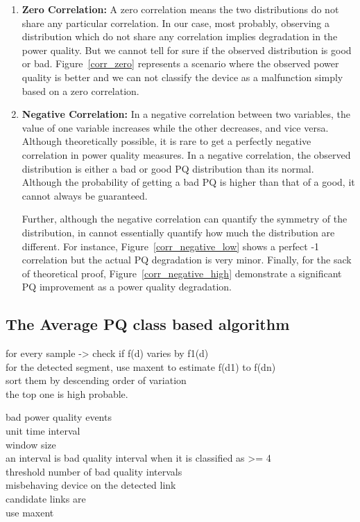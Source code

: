 \documentclass[12pt,oneside]{book}
\begin{document}
\begin{enumerate}
\item \textbf{Zero Correlation:} A zero correlation means the two distributions do not share any particular correlation. In our case, most probably, observing a distribution which do not share any correlation implies degradation in the power quality. But we cannot tell for sure if the observed distribution is good or bad. Figure~\ref{corr_zero} represents a scenario where the observed power quality is better and we can not classify the device as a malfunction simply based on a zero correlation.

\item \textbf{Negative Correlation:} In a negative correlation between two variables, the value of one variable increases while the other decreases, and vice versa. Although theoretically possible, it is rare to get a perfectly negative correlation in power quality measures. In a negative correlation, the observed distribution is either a bad or good PQ distribution than its normal. Although the probability of getting a bad PQ is higher than that of a good, it cannot always be guaranteed.

Further, although the negative correlation can quantify the symmetry of the distribution, in cannot essentially quantify how much the distribution are different. For instance, Figure~\ref{corr_negative_low} shows a perfect -1 correlation but the actual PQ degradation is very minor. Finally, for the sack of theoretical proof, Figure~\ref{corr_negative_high} demonstrate a significant PQ improvement as a power quality degradation.

\end{enumerate}


\subsection{The Average PQ class based algorithm}

for every sample -> check if f(d) varies by f1(d)\\
for the detected segment, use maxent to estimate f(d1) to f(dn)\\
sort them by descending order of variation\\
the top one is high probable.

bad power quality events\\
unit time interval\\
window size\\
an interval is bad quality interval when it is classified as >= 4\\
threshold number of bad quality intervals\\
misbehaving device on the detected link\\
candidate links are\\
use maxent
\end{document}
